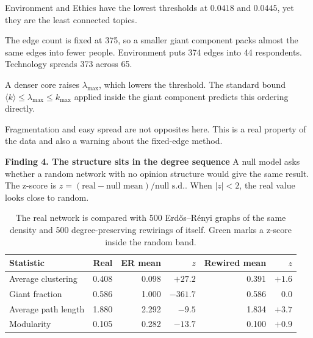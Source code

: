 \documentclass[11pt,a4paper]{article}
\newcommand{\gc}[1]{\cellcolor{hi}#1}
\newcommand{\rc}[1]{\cellcolor{lo}#1}
\newcommand{\lab}[1]{\textbf{#1}}
\begin{document}
\begin{dash}
  \item Environment and Ethics have the lowest thresholds at $0.0418$ and
  $0.0445$, yet they are the least connected topics.
  \item The edge count is fixed at 375, so a smaller giant component packs almost
  the same edges into fewer people. Environment puts 374 edges into 44
  respondents. Technology spreads 373 across 65.
  \item A denser core raises $\lambda_{\max}$, which lowers the threshold. The
  standard bound $\langle k\rangle \le \lambda_{\max} \le k_{\max}$ applied inside
  the giant component predicts this ordering directly.
  \item Fragmentation and easy spread are not opposites here. This is a real
  property of the data and also a warning about the fixed-edge method.
\end{dash}

\lab{Finding 4. The structure sits in the degree sequence} A null model asks
whether a random network with no opinion structure would give the same result.
The z-score is $z=(\text{real}-\text{null mean})/\text{null s.d.}$. When
$|z|<2$, the real value looks close to random.

\begin{table}[!ht]
\centering\small
\begin{tabular}{@{}lrrrrr@{}}
\toprule
\sffamily\bfseries Statistic & \sffamily Real & \sffamily ER mean &
\sffamily $z$ & \sffamily Rewired mean & \sffamily $z$ \\
\midrule
Average clustering  & 0.408 & 0.098 & \rc{$+27.2$} & 0.391 & \gc{$+1.6$} \\
Giant fraction      & 0.586 & 1.000 & \rc{$-361.7$} & 0.586 & \gc{$0.0$} \\
Average path length & 1.880 & 2.292 & \rc{$-9.5$} & 1.834 & $+3.7$ \\
Modularity          & 0.105 & 0.282 & \rc{$-13.7$} & 0.100 & \gc{$+0.9$} \\
\bottomrule
\end{tabular}
\caption{The real network is compared with 500 Erd\H{o}s--R\'enyi graphs of the
same density and 500 degree-preserving rewirings of itself. Green marks a
z-score inside the random band.}
\label{tab:null}
\end{table}
\end{document}

